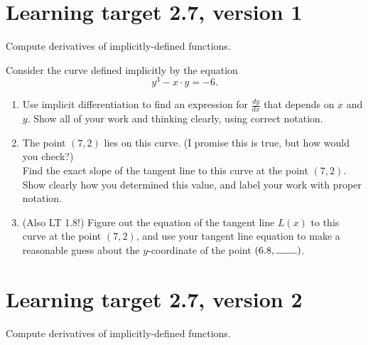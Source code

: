 
\usepackage{pgfplots}


%


\allowdisplaybreaks

\section{Learning target 2.7, version 1}

Compute derivatives of implicitly-defined functions.

\hrulefill

Consider the curve defined implicitly by the equation
\[y^3-x\cdot y = -6.\]
	
\begin{enumerate}[leftmargin=15pt]

	\item Use implicit differentiation to find an expression for $\frac{dy}{dx}$ that depends on $x$ and $y$.  Show all of your work and thinking clearly, using correct notation.

	\vfill

	\item The point $(7,2)$ lies on this curve. (I promise this is true, but how would you check?) \\
	Find the exact slope of the tangent line to this curve at the point \((7,2)\). Show clearly how you determined this value, and label your work with proper notation.

	\vspace{1.25in}

	
	\item (Also LT 1.8!) Figure out the equation of the tangent line $L(x)$ to this curve at the point $(7,2)$, and use your tangent line equation to make a reasonable guess about the $y$-coordinate of the point $(6.8, \rule{0.75cm}{0.15mm} )$.
	\vfill

\end{enumerate}

\pagebreak

\section{Learning target 2.7, version 2}

Compute derivatives of implicitly-defined functions.

\hrulefill

